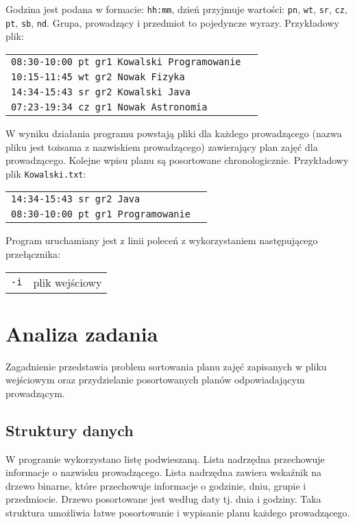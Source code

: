 \documentclass[12pt,a4paper,twoside]{article}
\let\oldmarginpar\marginpar
\renewcommand\marginpar[1]{%
  {\linespread{0.85}\normalfont\scriptsize%
\oldmarginpar[\hspace{1cm}\begin{minipage}{3cm}\raggedleft\scriptsize\color{black}\textsf{#1}\end{minipage}]%
{\hspace{0cm}\begin{minipage}{3cm}\raggedright\scriptsize\color{black}\textsf{#1}\end{minipage}}%
}%
}
\begin{document}
\noindent Godzina jest podana w formacie: \texttt{hh:mm}, dzień przyjmuje wartości: \texttt{pn}, \texttt{wt}, \texttt{sr}, \texttt{cz}, \texttt{pt}, \texttt{sb}, \texttt{nd}. Grupa,
prowadzący i przedmiot to pojedyncze wyrazy. Przykładowy plik: \newline

\begin{tabular}{ll}
\texttt{08:30-10:00 pt gr1 Kowalski Programowanie} \\
\texttt{10:15-11:45 wt gr2 Nowak Fizyka} \\
\texttt{14:34-15:43 sr gr2 Kowalski Java} \\
\texttt{07:23-19:34 cz gr1 Nowak Astronomia} \\
\end{tabular} \newline

\noindent W wyniku działania programu powstają pliki dla każdego prowadzącego (nazwa pliku jest tożsama z
nazwiskiem prowadzącego) zawierający plan zajęć dla prowadzącego. Kolejne wpisu planu są posortowane chronologicznie. Przykładowy plik \texttt{Kowalski.txt}: \newline

\begin{tabular}{ll}
\texttt{14:34-15:43 sr gr2 Java} \\
\texttt{08:30-10:00 pt gr1 Programowanie} \\
\end{tabular} \newline

Program uruchamiany jest z linii poleceń z wykorzystaniem następującego przełącznika: \\
\begin{tabular}{ll}
\texttt{-i} & plik wejściowy \\
\end{tabular}

\section{Analiza zadania}
\marginpar{}

Zagadnienie przedstawia problem sortowania planu zajęć zapisanych w pliku wejściowym oraz przydzielanie posortowanych planów odpowiadającym prowadzącym.

\subsection{Struktury danych}
\marginpar{}
W programie wykorzystano listę podwieszaną. Lista nadrzędna przechowuje informacje o nazwisku prowadzącego. Lista nadrzędna zawiera wskaźnik na drzewo binarne, które przechowuje informacje o godzinie, dniu, grupie i przedmiocie. Drzewo posortowane jest według daty tj. dnia i godziny. Taka struktura umożliwia łatwe posortowanie i wypisanie planu każdego prowadzącego.
\end{document}
